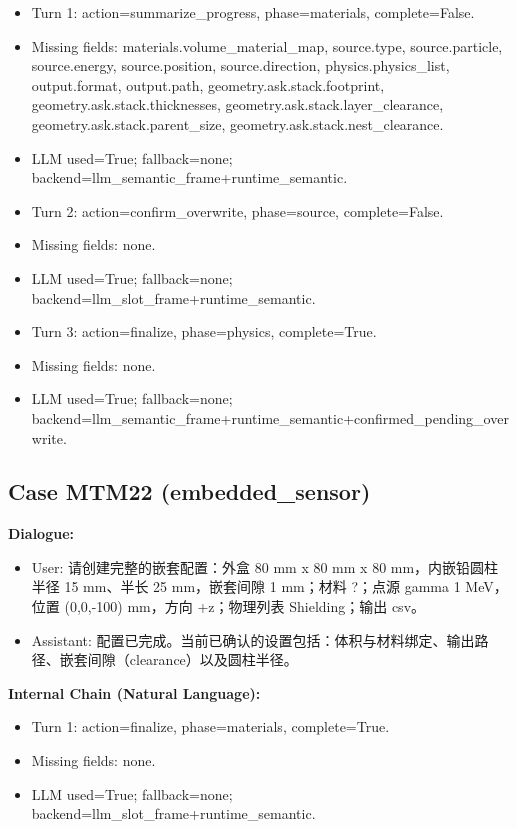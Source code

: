 \documentclass[11pt]{ctexart}
\begin{document}
\begin{itemize}
\item Turn 1: action=summarize\_progress, phase=materials, complete=False.
\item Missing fields: materials.volume\_material\_map, source.type, source.particle, source.energy, source.position, source.direction, physics.physics\_list, output.format, output.path, geometry.ask.stack.footprint, geometry.ask.stack.thicknesses, geometry.ask.stack.layer\_clearance, geometry.ask.stack.parent\_size, geometry.ask.stack.nest\_clearance.
\item LLM used=True; fallback=none; backend=llm\_semantic\_frame+runtime\_semantic.
\item Turn 2: action=confirm\_overwrite, phase=source, complete=False.
\item Missing fields: none.
\item LLM used=True; fallback=none; backend=llm\_slot\_frame+runtime\_semantic.
\item Turn 3: action=finalize, phase=physics, complete=True.
\item Missing fields: none.
\item LLM used=True; fallback=none; backend=llm\_semantic\_frame+runtime\_semantic+confirmed\_pending\_overwrite.
\end{itemize}
\subsection{Case MTM22 (embedded\_sensor)}
\textbf{Dialogue:}
\begin{itemize}
\item User: 请创建完整的嵌套配置：外盒 80 mm x 80 mm x 80 mm，内嵌铅圆柱半径 15 mm、半长 25 mm，嵌套间隙 1 mm；材料 ?；点源 gamma 1 MeV，位置 (0,0,-100) mm，方向 +z；物理列表 Shielding；输出 csv。
\item Assistant: 配置已完成。当前已确认的设置包括：体积与材料绑定、输出路径、嵌套间隙（clearance）以及圆柱半径。
\end{itemize}
\textbf{Internal Chain (Natural Language):}
\begin{itemize}
\item Turn 1: action=finalize, phase=materials, complete=True.
\item Missing fields: none.
\item LLM used=True; fallback=none; backend=llm\_slot\_frame+runtime\_semantic.
\end{itemize}
\end{document}
